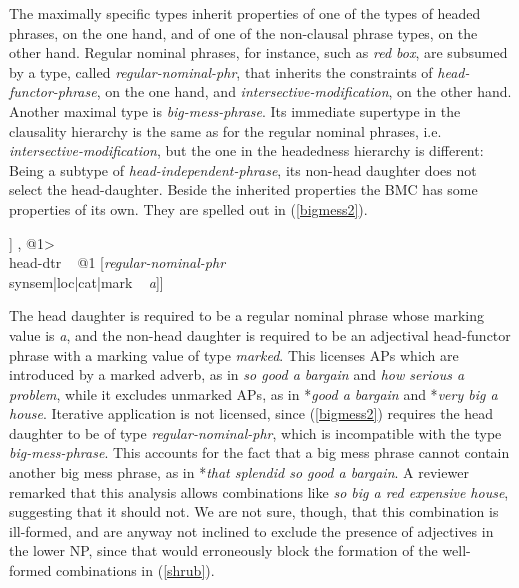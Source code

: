 \documentclass[output=paper]{langsci/langscibook}
\begin{document}
The maximally specific types inherit properties of one of the types of headed phrases,
on the one hand, and of one of the non-clausal phrase types, on the other hand.  
Regular nominal phrases, for instance, such as {\it red box}, are subsumed 
by a type, called {\it regular-nominal-phr}, that inherits the 
constraints of {\it head-functor-phrase}, on the one hand, and 
{\it intersective-modification}, on the other hand.  
Another maximal type is {\it big-mess-phrase}. 
Its immediate supertype in the {\sc clausality} hierarchy is the same 
as for the regular nominal phrases, i.e. {\it intersective-modification\/}, 
but the one in the {\sc headedness} hierarchy is different: 
Being a subtype of {\it head-independent-phrase}, 
its non-head daughter does not select the head-daughter. 
Beside the inherited properties the BMC has some properties of its own.   
They are spelled out in (\ref{bigmess2}).

\begin{exe}
\ex\label{bigmess2} 
\begin{avm}
[{\it big-mess-phr\/}                                    \\     
 dtrs ~ <[{\it hd-functor-phr\/}                         \\
          synsem|loc|cat [head ~ {\it adjective\/}       \\
                          mark ~ {\it marked\/} ]] , @1> \\
 head-dtr ~ @1 [{\it regular-nominal-phr\/}              \\
                synsem|loc|cat|mark ~ {\it a\/}]]
\end{avm}
\end{exe}

\noindent
The head daughter is required to be a regular nominal phrase 
whose {\sc marking} value is {\it a}, and the non-head daughter 
is required to be an adjectival head-functor phrase
with a {\sc marking} value of type {\it marked}. 
This licenses APs which are introduced by a marked adverb, 
as in {\it so good a bargain\/} and {\it how serious a problem}, 
while it excludes unmarked APs, as in 
*{\it good a bargain\/} and *{\it very big a house}.
Iterative application is not licensed, since (\ref{bigmess2}) requires the 
head daughter to be of type {\it regular-nominal-phr}, which is incompatible with the type 
{\it big-mess-phrase}. This accounts for the fact that a big
mess phrase cannot contain another big mess phrase, as in
*{\it that splendid so good a bargain}.
A reviewer remarked that this analysis allows combinations like 
{\it so big a red expensive house}, suggesting that it should not. 
We are not sure, though, that this combination is ill-formed, 
and are anyway not inclined to exclude the presence of adjectives in 
the lower NP, since that would erroneously block the formation of the 
well-formed combinations in (\ref{shrub}).
\end{document}
